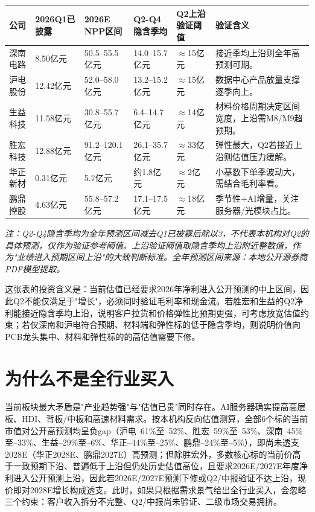 \begin{exhibitbox}[图表1-2：Q2盈利桥接与验证阈值]
\small
\begin{tabularx}{\textwidth}{L{1.7cm}R{1.5cm}R{1.6cm}R{1.8cm}R{1.9cm}X}
\toprule
\textbf{公司} & \textbf{2026Q1已披露} & \textbf{2026E NPP区间} & \textbf{Q2-Q4隐含季均} & \textbf{Q2上沿验证阈值} & \textbf{验证含义} \\
\midrule
深南电路 & 8.50亿元 & 50.5--55.5亿元 & 14.0--15.7亿元 & $\approx$15亿元 & 接近季均上沿则全年高预测可期。 \\
沪电股份 & 12.42亿元 & 52.0--58.0亿元 & 13.2--15.2亿元 & $\approx$15亿元 & 数据中心产品放量支撑逐季向上。 \\
生益科技 & 11.58亿元 & 30.8--55.7亿元 & 6.4--14.7亿元 & $\approx$14亿元 & 材料价格周期决定区间宽度，上沿需M8/M9超预期。 \\
胜宏科技 & 12.88亿元 & 91.2--120.1亿元 & 26.1--35.7亿元 & $\approx$33亿元 & 弹性最大，Q2若接近上沿则估值压力缓解。 \\
华正新材 & 0.31亿元 & 5.7亿元 & 约1.8亿元 & $\approx$2亿元 & 小基数下单季波动大，需结合毛利率看。 \\
鹏鼎控股 & 4.63亿元 & 55.8--57.2亿元 & 17.1--17.5亿元 & $\approx$18亿元 & 季节性+AI增量，关注服务器/光模块占比。 \\
\bottomrule
\end{tabularx}
\par{\scriptsize\color{mutedgrey}\textit{注：Q2-Q4隐含季均为全年预测区间减去Q1已披露后除以3，不代表本机构对Q2的具体预测，仅作为验证参考阈值。上沿验证阈值取隐含季均上沿附近整数值，作为"业绩进入预期区间上沿"的大致判断标准。全年预测区间来源：本地公开源券商PDF模型提取。}}
\end{exhibitbox}

这张表的投资含义是：当前估值已经要求2026年净利进入公开预测的中上区间，因此Q2不能仅满足于"增长"，必须同时验证毛利率和现金流。若胜宏和生益的Q2净利能接近隐含季均上沿，说明客户拉货和价格弹性比预期更强，可考虑放宽估值约束；若仅深南和沪电符合预期、材料端和弹性标的低于隐含季均，则说明价值向PCB龙头集中、材料和弹性标的的高估值需要下修。

\section{为什么不是全行业买入}

当前板块最大矛盾是"产业趋势强"与"估值已贵"同时存在。AI服务器确实提高高层板、HDI、背板/中板和高速材料需求。按本机构反向估值测算，全部6个标的当前市值对公开高预测均呈负gap（沪电--61\%至--52\%、胜宏--59\%至--53\%、深南--45\%至--33\%、生益--29\%至--6\%、华正--44\%至--25\%、鹏鼎--24\%至--5\%），即尚未透支2028E（华正2028E、鹏鼎2027E）高预测；但除胜宏外，多数核心标的当前价高于一致预期下沿、普遍低于上沿但仍处历史估值高位，且要求2026E/2027E年度净利进入公开预测上沿，因此若2026E/2027E预测下修或Q2/中报验证不达上沿，现价即对2028E增长构成透支。此时，如果只根据需求景气给出全行业买入，会忽略三个约束：客户收入拆分不完整、Q2/中报尚未验证、二级市场交易拥挤。

